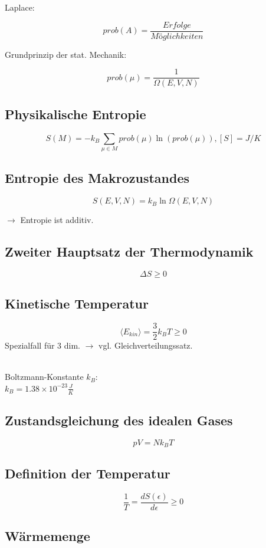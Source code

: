 \documentclass{article}
\begin{document}
\begin{multicols*}{3}
  Laplace:

  $$prob(A)=\frac{Erfolge}{Möglichkeiten}$$

  Grundprinzip der stat. Mechanik:

  $$prob(\mu) = \frac{1}{\Omega (E,V,N)}$$

  \subsection{Physikalische Entropie}

  $$S(M)= -k_B\sum_{\mu \in M} prob(\mu) \ln(prob(\mu)),[S]=J/K$$

  \subsection{Entropie des Makrozustandes}

  $$S(E,V,N) = k_B \ln \Omega (E,V,N)$$

  $\rightarrow$ Entropie ist additiv.

  \subsection{Zweiter Hauptsatz der Thermodynamik}
  $$\Delta S \geq 0$$

  \subsection{Kinetische Temperatur}

  $$\langle E_{kin}\rangle = \frac{3}{2}k_BT\geq 0$$
  Spezialfall für 3 dim.  $\rightarrow$ vgl. Gleichverteilungssatz.

  \\Boltzmann-Konstante $k_B$:\\
  $k_B=1.38\times 10^{-23}\frac{J}{K}$

  \subsection{Zustandsgleichung des idealen Gases}

  $$pV=Nk_BT$$

  \subsection{Definition der Temperatur}

  $$\frac{1}{T} = \frac{dS(\epsilon)}{d\epsilon}\geq 0$$

  \subsection{Wärmemenge}


\end{multicols*}
\end{document}
